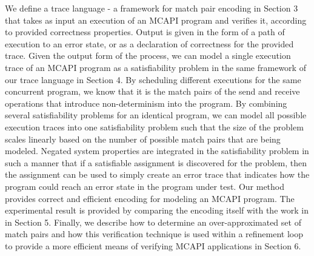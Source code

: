 We define a trace language - a framework for match pair encoding in Section 3 that
takes as input an execution of an MCAPI program and verifies it, according to
provided correctness properties. Output is given in the form of a path of
execution to an error state, or as a declaration of correctness for the
provided trace. Given the output form of the process, we can model a single execution trace of an MCAPI program as a satisfiability problem in the same framework of our trace language in Section 4. By scheduling different executions for the same concurrent program, we know that it is the match pairs of the send and receive operations that
introduce non-determinism into the program. By combining several satisfiability problems for an identical program, we can model all possible execution traces into one satisfiability problem such that the size of the problem scales linearly based on the number of possible match pairs that are being modeled. Negated
system properties are integrated in the satisfiability problem in such a manner
that if a satisfiable assignment is discovered for the problem, then the
assignment can be used to simply create an error trace that indicates how the
program could reach an error state in the program under test. Our method provides correct and efficient encoding for modeling an MCAPI program. The experimental result is provided by comparing the encoding itself with the work in \cite{elwakil:padtad10} in Section 5. Finally, we describe how to determine an over-approximated set of match pairs and how this verification technique is used within a
refinement loop to provide a more efficient means of verifying MCAPI
applications in Section 6.  




